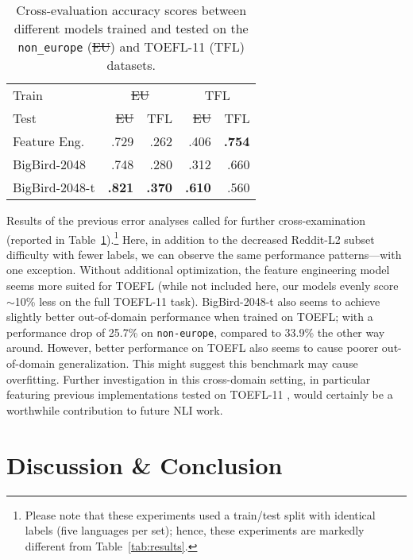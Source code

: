 \documentclass[10pt, a4paper]{article}
\begin{document}
\begin{table}[t]
    \footnotesize
    \centering
    \begin{tabular}{p{3cm}rrrr}
        \toprule
        Train & \multicolumn{2}{c}{\st{EU}} & \multicolumn{2}{c}{TFL} \\
        \cmidrule{2-3} \cmidrule{4-5}
        Test & \st{EU} &  TFL & \st{EU} &  TFL \\
        \midrule
        Feature Eng.   &     .729  &     .262  &     .406  & \bf{.754} \\
        BigBird-2048   &     .748  &     .280  &     .312  &     .660 \\
        BigBird-2048-t & \bf{.821} & \bf{.370} & \bf{.610} &     .560 \\
        \bottomrule
    \end{tabular}
    \caption{Cross-evaluation accuracy scores between different models trained and tested on the \texttt{non\_europe} (\st{EU}) and TOEFL-11 (TFL) datasets.}
    \label{tab:cross-results}
\end{table}

Results of the previous error analyses called for further cross-examination (reported in Table~\ref{tab:cross-results}).\footnote{Please note that these experiments used a train/test split with identical labels (five languages per set); hence, these experiments are markedly different from Table~\ref{tab:results}.} Here, in addition to the decreased Reddit-L2 subset difficulty with fewer labels, we can observe the same performance patterns---with one exception. Without additional optimization, the feature engineering model seems more suited for TOEFL (while not included here, our models evenly score $\sim$10\% less on the full TOEFL-11 task). BigBird-2048-t also seems to achieve slightly better out-of-domain performance when trained on TOEFL; with a performance drop of 25.7\% on \texttt{non-europe}, compared to 33.9\% the other way around. However, better performance on TOEFL also seems to cause poorer out-of-domain generalization. This might suggest this benchmark may cause overfitting. Further investigation in this cross-domain setting, in particular featuring previous implementations tested on TOEFL-11 \cite{DBLP:conf/bea/MalmasiECTPHNQ17}, would certainly be a worthwhile contribution to future NLI work.


\section{Discussion \& Conclusion}
\end{document}
